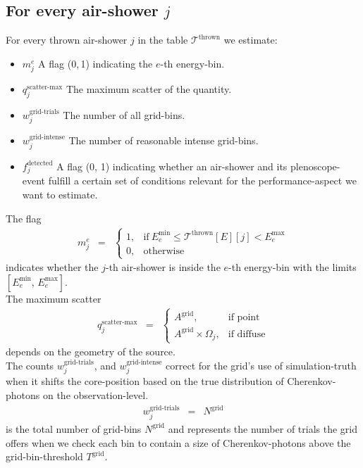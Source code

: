 \documentclass[a4paper,12pt,oneside]{article}
\def\Tab{\mathcal{T}^\text{thrown}}
\def\WeightGridTrials{w^\text{grid-trials}}
\def\WeightGridSuccesses{w^\text{grid-intense}}
\begin{document}
\subsection*{For every air-shower $j$}
%
For every thrown air-shower $j$ in the table $\Tab{}$ we estimate:
%
\begin{itemize}
\item $m^e_j$ A flag (0,\,1) indicating the $e$-th energy-bin.
\item $q^\text{scatter-max}_j$ The maximum scatter of the quantity.
\item $\WeightGridTrials_j$ The number of all grid-bins.
\item $\WeightGridSuccesses_j$ The number of reasonable intense grid-bins.
\item $f^\text{detected}_j$ A flag (0, 1) indicating whether an air-shower and its plenoscope-event fulfill a certain set of conditions relevant for the performance-aspect we want to estimate.
\end{itemize}
%
The flag
%
\begin{eqnarray}
m^e_j &=& \begin{cases}
  1, & \text{if}\ E^\text{min}_e \leq \Tab{}[E][j] < E^\text{max}_e \\
  0, & \text{otherwise}
\end{cases}
\label{EqEnergyMask}
\end{eqnarray}
%
indicates whether the $j$-th air-shower is inside the $e$-th energy-bin with the limits $[E^\text{min}_e,\,E^\text{max}_e]$.\\
%
The maximum scatter
%
\begin{eqnarray}
q^\text{scatter-max}_j &=& \begin{cases}
  A^\text{grid}, & \text{if point} \\
  A^\text{grid} \times \Omega_j, & \text{if diffuse}
\end{cases}
\label{EqScatterQuantity}
\end{eqnarray}
%
depends on the geometry of the source.\\
%
The counts $\WeightGridTrials_j$, and $\WeightGridSuccesses_j$ correct for the grid's use of simulation-truth when it shifts the core-position based on the true distribution of Cherenkov-photons on the observation-level.
%
\begin{eqnarray}
\WeightGridTrials_j &=& N^\text{grid}
\label{EqWeightThrown}
\end{eqnarray}
%
is the total number of grid-bins $N^\text{grid}$ and represents the number of trials the grid offers when we check each bin to contain a size of Cherenkov-photons above the grid-bin-threshold $T^\text{grid}$.
\end{document}
